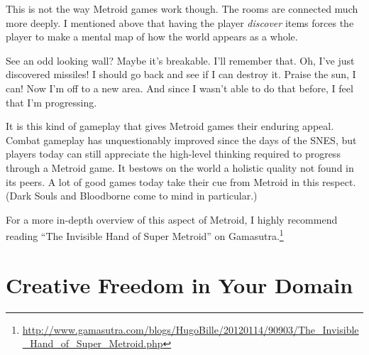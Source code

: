 \documentclass{article}
\begin{document}
This is not the way Metroid games work though. The rooms are connected much more deeply. I mentioned above that having the player \emph{discover} items forces the player to make a mental map of how the world appears as a whole.

See an odd looking wall? Maybe it's breakable. I'll remember that. Oh, I've just discovered missiles! I should go back and see if I can destroy it. Praise the sun, I can! Now I'm off to a new area. And since I wasn't able to do that before, I feel that I'm progressing.

It is this kind of gameplay that gives Metroid games their enduring appeal. Combat gameplay has unquestionably improved since the days of the SNES, but players today can still appreciate the high-level thinking required to progress through a Metroid game. It bestows on the world a holistic quality not found in its peers. A lot of good games today take their cue from Metroid in this respect. (Dark Souls and Bloodborne come to mind in particular.)

For a more in-depth overview of this aspect of Metroid, I highly recommend reading ``The Invisible Hand of Super Metroid'' on Gamasutra.\footnote{\url{http://www.gamasutra.com/blogs/HugoBille/20120114/90903/The_Invisible_Hand_of_Super_Metroid.php}}

\section{Creative Freedom in Your Domain}
\end{document}
